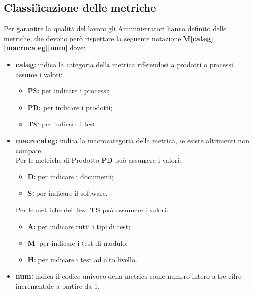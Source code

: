 \documentclass[NormeDiProgetto.tex]{subfiles}
\begin{document}
	\subsection{Classificazione delle metriche}
	Per garantire la qualità del lavoro gli Amministratori hanno definito delle metriche, che devono però rispettare la seguente notazione \textbf{M[categ][macrocateg][num]}	dove:
	\begin{itemize}
		\item \textbf{categ:} indica la categoria della metrica riferendosi a prodotti o processi assume i valori:
		\begin{itemize}
			\item \textbf{PS:} per indicare i processi;
			\item \textbf{PD:} per indicare i prodotti;
			\item \textbf{TS:} per indicare i test.
		\end{itemize}
		\item \textbf{macrocateg:} indica la macrocategoria della metrica, se esiste altrimenti non compare.\\
		Per le metriche di Prodotto \textbf{PD} può assumere i valori:
		\begin{itemize}
			\item \textbf{D:} per indicare i documenti;
			\item \textbf{S:} per indicare il software.
		\end{itemize}
		Per le metriche dei Test \textbf{TS} può assumere i valori:
		\begin{itemize}
			\item \textbf{A:} per indicare tutti i tipi di test;
			\item \textbf{M:} per indicare i test di modulo;
			\item \textbf{H:} per indicare i test ad alto livello.		
		\end{itemize}
		\item \textbf{num:} indica il codice univoco della metrica come numero intero a tre cifre incrementale a partire da 1.
	\end{itemize}	
	
\end{document}

